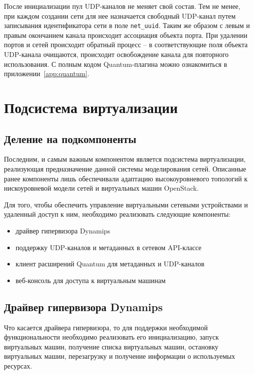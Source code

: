 После инициализации пул UDP-каналов не меняет свой состав. 
Тем не менее, при каждом создании сети для нее назначается свободный UDP-канал
путем записывания идентификатора сети в поле \verb`net_uuid`. Таким же образом с 
левым и правым окончанием канала происходит ассоциация объекта порта.
При удалении портов и сетей происходит обратный процесс -- в соответствующие поля 
объекта UDP-канала очищаются, происходит освобождение канала для повторного использования.
С полным кодом Quantum-плагина можно ознакомиться в приложении~\ref{app:quantum}.

\section{Подсистема виртуализации}

\subsection{Деление на подкомпоненты}

Последним, и самым важным компонентом является подсистема виртуализации, реализующая
предназначение данной системы моделирования сетей. Описанные ранее компоненты лишь
обеспечивали адаптацию высокоуровневого топологий к нискоуровневой модели 
сетей и виртуальных машин OpenStack. 

Для того, чтобы обеспечить управление виртуальными сетевыми устройствами и удаленный доступ к 
ним, необходимо реализовать следующие компоненты:
\begin{itemize}
    \item драйвер гипервизора Dynamips
    \item поддержку UDP-каналов и метаданных в сетевом API-классе
    \item клиент расширений Quantum для метаданных и UDP-каналов
    \item веб-консоль для доступа к виртуальным машинам    
\end{itemize}

\subsection{Драйвер гипервизора Dynamips}

Что касается драйвера гипервизора, то для поддержки необходимой функциональности
необходимо реализовать его инициализацию, запуск виртуальных машин, получение списка 
виртуальных машин,
остановку виртуальных машин, перезагрузку и получение информации о используемых
ресурсах.

